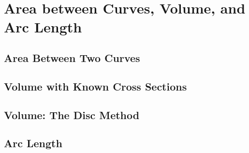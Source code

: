 \documentclass[../bccalc.tex]{subfiles}
\begin{document}
\chapter{Area between Curves, Volume, and Arc Length}
\section{Area Between Two Curves}

\section{Volume with Known Cross Sections}

\section{Volume: The Disc Method}

\section{Arc Length}
\end{document}
